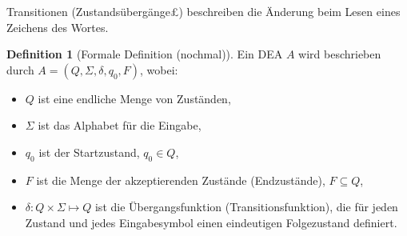 \documentclass[11pt]{article} %
\theoremstyle{definition}
\newtheorem{definition}{Definition}
\begin{document}
Transitionen (Zustandsübergänge£) beschreiben die Änderung beim Lesen eines Zeichens des Wortes.

\begin{definition}[Formale Definition (nochmal)]
Ein DEA $A$ wird beschrieben durch $A = (Q, \Sigma, \delta, q_0, F)$, wobei:
\begin{itemize}
\item $Q$ ist eine endliche Menge von Zuständen,
\item $\Sigma$ ist das Alphabet für die Eingabe,
\item $q_0$ ist der Startzustand, $q_0 \in Q$,
\item $F$ ist die Menge der akzeptierenden Zustände (Endzustände), $F \subseteq Q$,
\item $\delta: Q \times \Sigma \mapsto Q$ ist die Übergangsfunktion (Transitionsfunktion), die für jeden Zustand und jedes Eingabesymbol einen eindeutigen Folgezustand definiert.

\end{itemize}
\end{definition}
\end{document}
